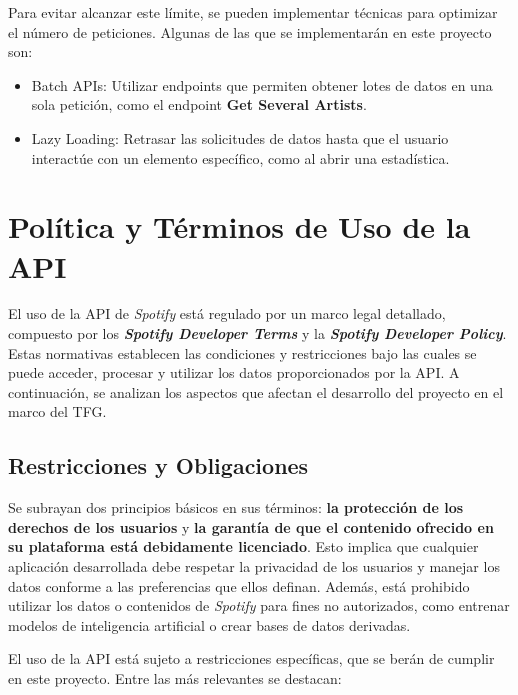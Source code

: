 Para evitar alcanzar este límite, se pueden implementar técnicas para optimizar el número de peticiones. Algunas de las que se implementarán en este proyecto son:

\begin{itemize}
    \item Batch APIs: Utilizar endpoints que permiten obtener lotes de datos en una sola petición, como el endpoint \textbf{Get Several Artists}.
    \item Lazy Loading: Retrasar las solicitudes de datos hasta que el usuario interactúe con un elemento específico, como al abrir una estadística.
\end{itemize}

\newpage

\section{Política y Términos de Uso de la API}

El uso de la API de \textit{Spotify} está regulado por un marco legal detallado, compuesto por los \textit{\textbf{Spotify Developer Terms}} y la \textit{\textbf{Spotify Developer Policy}}. Estas normativas establecen las condiciones y restricciones bajo las cuales se puede acceder, procesar y utilizar los datos proporcionados por la API. A continuación, se analizan los aspectos que afectan el desarrollo del proyecto en el marco del TFG.

\subsection{Restricciones y Obligaciones}

Se subrayan dos principios básicos en sus términos: \textbf{la protección de los derechos de los usuarios} y \textbf{la garantía de que el contenido ofrecido en su plataforma está debidamente licenciado}. Esto implica que cualquier aplicación desarrollada debe respetar la privacidad de los usuarios y manejar los datos conforme a las preferencias que ellos definan. Además, está prohibido utilizar los datos o contenidos de \textit{Spotify} para fines no autorizados, como entrenar modelos de inteligencia artificial o crear bases de datos derivadas.

El uso de la API está sujeto a restricciones específicas, que se berán de cumplir en este proyecto. Entre las más relevantes se destacan:

